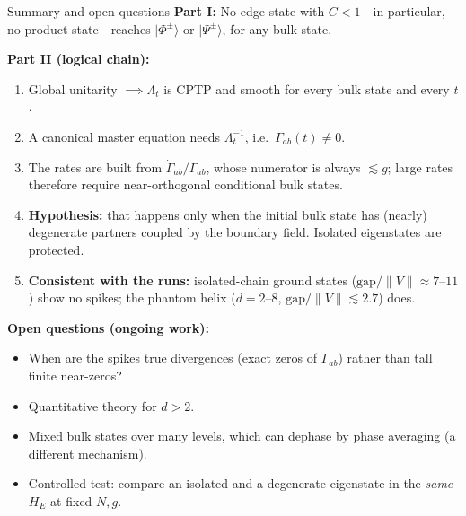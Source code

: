 \documentclass[aspectratio=169,11pt]{beamer}
\newcommand{\ket}[1]{\lvert #1\rangle}
\begin{document}
\begin{frame}{Summary and open questions}
\footnotesize
\textbf{Part I:} No edge state with $C<1$---in particular, no product state---reaches $\ket{\Phi^\pm}$ or $\ket{\Psi^\pm}$, for any bulk state.
\smallskip

\textbf{Part II (logical chain):}
\begin{enumerate}\setlength\itemsep{2.5pt}
\item Global unitarity $\implies\Lambda_t$ is CPTP and smooth for every bulk state and every $t$.
\item A canonical master equation needs $\Lambda_t^{-1}$, i.e.\ $\Gamma_{ab}(t)\neq0$.
\item The rates are built from $\dot\Gamma_{ab}/\Gamma_{ab}$, whose numerator is always $\lesssim g$; large rates therefore require near-orthogonal conditional bulk states.
\item \textbf{Hypothesis:} that happens only when the initial bulk state has (nearly) degenerate partners coupled by the boundary field. Isolated eigenstates are protected.
\item \textbf{Consistent with the runs:} isolated-chain ground states ($\text{gap}/\lVert V\rVert\approx7$--$11$) show no spikes; the phantom helix ($d=2$--$8$, $\text{gap}/\lVert V\rVert\lesssim2.7$) does.
\end{enumerate}
\smallskip

\textbf{Open questions (ongoing work):}
\begin{itemize}\setlength\itemsep{2pt}
\item When are the spikes true divergences (exact zeros of $\Gamma_{ab}$) rather than tall finite near-zeros?
\item Quantitative theory for $d>2$.
\item Mixed bulk states over many levels, which can dephase by phase averaging (a different mechanism).
\item Controlled test: compare an isolated and a degenerate eigenstate in the \emph{same} $H_E$ at fixed $N,g$.
\end{itemize}
\end{frame}

\begin{frame}[plain]
\end{frame}

\appendix
\end{document}

